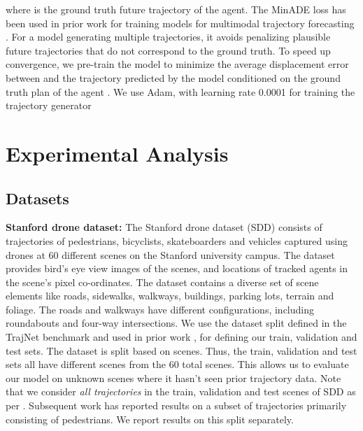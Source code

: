 \documentclass[journal]{IEEEtran}
\begin{document}
where  is the ground truth future trajectory of the agent. The MinADE loss has been used in prior work for training models for multimodal trajectory forecasting \cite{gupta2018social, cui2019multimodal, sadeghian2018sophie}. For a model generating multiple trajectories, it avoids penalizing plausible future trajectories that do not correspond to the ground truth. 
To speed up convergence, we pre-train the model to minimize the average displacement error between  and the trajectory predicted by the model conditioned on the ground truth plan of the agent . We use Adam, with learning rate 0.0001 for training the trajectory generator


































\section{Experimental Analysis}


\subsection{Datasets}

\noindent \textbf{Stanford drone dataset:}  The Stanford drone dataset (SDD) \cite{robicquet2016learning} consists of trajectories of pedestrians, bicyclists, skateboarders and vehicles captured using drones at 60 different scenes on the Stanford university campus. The dataset provides bird's eye view images of the scenes, and locations of tracked agents in the scene's pixel co-ordinates. The dataset contains a diverse set of scene elements like roads, sidewalks, walkways, buildings, parking lots, terrain and foliage. The roads and walkways have different configurations, including roundabouts and four-way intersections. We use the dataset split defined in the TrajNet benchmark \cite{sadeghian2018trajnet} and used in prior work \cite{sadeghian2018sophie, zhao2019multi, bhattacharyya2019conditional}, for defining our train, validation and test sets. The dataset is split based on scenes. Thus, the train, validation and test sets all have different scenes from the 60 total scenes. This allows us to evaluate our model on unknown scenes where it hasn't seen prior trajectory data. Note that we consider \textit{all trajectories} in the train, validation and test scenes of SDD as per \cite{sadeghian2018sophie, zhao2019multi, bhattacharyya2019conditional, bhattacharyya2020haar}. Subsequent work \cite{mangalam2020goals, mangalam2020not} has reported results on a subset of trajectories primarily consisting of pedestrians. We report results on this split separately.     
\end{document}
